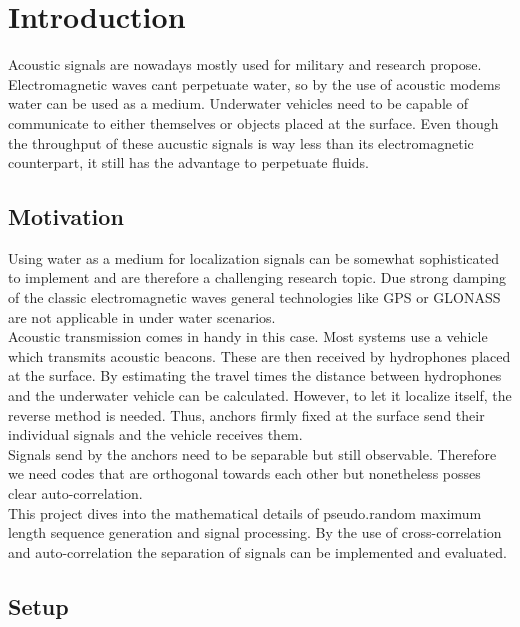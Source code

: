 \chapter{Introduction}

Acoustic signals are nowadays mostly used for military and research propose. Electromagnetic waves cant perpetuate water, so by the use of acoustic modems water can be used as a medium. Underwater vehicles need to be capable of communicate to either themselves or objects placed at the surface. Even though the throughput of these aucustic signals is way less than its electromagnetic counterpart, it still has the advantage to perpetuate fluids.\\


\section{Motivation}

Using water as a medium for localization signals can be somewhat sophisticated to implement and are therefore a challenging research topic. Due strong damping of the classic electromagnetic waves general technologies like GPS or GLONASS are not applicable in under water scenarios. \\
Acoustic transmission comes in handy in this case. Most systems use a vehicle which transmits acoustic beacons. These are then received by hydrophones placed at the surface. By estimating the travel times the distance between hydrophones and the underwater vehicle can be calculated. However, to let it localize itself, the reverse method is needed. Thus, anchors firmly fixed at the surface send their individual signals and the vehicle receives them.\\
Signals send by the anchors need to be separable but still observable. Therefore we need codes that are orthogonal towards each other but nonetheless posses clear auto-correlation. \\
This project dives into the mathematical details of pseudo.random maximum length sequence generation and signal processing. By the use of cross-correlation and auto-correlation the separation of signals can be implemented and evaluated. 

\section{Setup}

